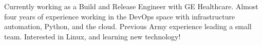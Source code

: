 

\begin{cvparagraph}

Currently working as a Build and Release Engineer with GE Healthcare. Almost four years of experience working in the DevOps space with infrastructure automation, Python, and the cloud. Previous Army experience leading a small team. Interested in Linux, and learning new technology!
\end{cvparagraph}
